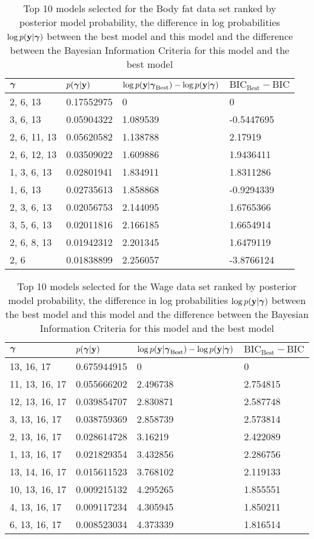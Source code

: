 \documentclass{amsart}
\begin{document}
\begin{table}
\label{tab:numerical_results_bodyfat}
\caption{Top 10 models selected for the Body fat data set ranked by posterior model probability, the difference
					in log probabilities $\log p({\bf y}|{\boldsymbol \gamma})$ between the best model and this model and the difference
					between the Bayesian Information Criteria for this model and the best model}
\begin{tabular}{|l|lll|}
\hline
${\boldsymbol \gamma}$ & $p({\boldsymbol \gamma}|{\bf y})$ & $\log p({\bf y} | {\boldsymbol \gamma}_\text{Best}) - \log p({\bf y} | {\boldsymbol \gamma})$ & $\text{BIC}_\text{Best} - \text{BIC}$ \\
\hline
2, 6, 13 & 0.17552975 & 0 & 0 \\
3, 6, 13 & 0.05904322 & 1.089539 & -0.5447695 \\
2, 6, 11, 13 & 0.05620582 & 1.138788 & 2.17919 \\
2, 6, 12, 13 & 0.03509022 & 1.609886 & 1.9436411 \\
1, 3, 6, 13 & 0.02801941 & 1.834911 & 1.8311286 \\
1, 6, 13 & 0.02735613 & 1.858868 & -0.9294339 \\
2, 3, 6, 13 & 0.02056753 & 2.144095 & 1.6765366 \\
3, 5, 6, 13 & 0.02011816 & 2.166185 & 1.6654914 \\
2, 6, 8, 13 & 0.01942312 & 2.201345 & 1.6479119 \\
2, 6 & 0.01838899 & 2.256057 & -3.8766124 \\
\hline
\end{tabular}
\end{table}

\begin{table}
\label{tab:numerical_results_wage}
\caption{Top 10 models selected for the Wage data set ranked by posterior model probability, the difference
					in log probabilities $\log p({\bf y}|{\boldsymbol \gamma})$ between the best model and this model and the difference
					between the Bayesian Information Criteria for this model and the best model}
\begin{tabular}{|l|lll|}
\hline
${\boldsymbol \gamma}$ & $p({\boldsymbol \gamma}|{\bf y})$ & $\log p({\bf y} | {\boldsymbol \gamma}_\text{Best}) - \log p({\bf y} | {\boldsymbol \gamma})$ & $\text{BIC}_\text{Best} - \text{BIC}$ \\
\hline
13, 16, 17 & 0.675944915 & 0 & 0 \\
11, 13, 16, 17 & 0.055666202 & 2.496738 & 2.754815 \\
12, 13, 16, 17 & 0.039854707 & 2.830871 & 2.587748 \\
3, 13, 16, 17 & 0.038759369 & 2.858739 & 2.573814 \\
2, 13, 16, 17 & 0.028614728 & 3.16219 & 2.422089 \\
1, 13, 16, 17 & 0.021829354 & 3.432856 & 2.286756 \\
13, 14, 16, 17 & 0.015611523 & 3.768102 & 2.119133 \\
10, 13, 16, 17 & 0.009215132 & 4.295265 & 1.855551 \\
4, 13, 16, 17 & 0.009117234 & 4.305945 & 1.850211 \\
6, 13, 16, 17 & 0.008523034 & 4.373339 & 1.816514 \\
\hline
\end{tabular}
\end{table}
\end{document}
